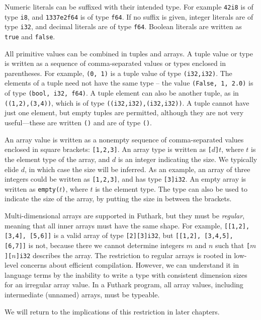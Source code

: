 \documentclass[oneside,11pt]{book}
\begin{document}
Numeric literals can be suffixed with their intended type.  For
example \texttt{42i8} is of type \texttt{i8}, and \texttt{1337e2f64}
is of type \texttt{f64}.  If no suffix is given, integer literals are
of type \texttt{i32}, and decimal literals are of type \texttt{f64}.
Boolean literals are written as \texttt{true} and \texttt{false}.

All primitive values can be combined in tuples and arrays.  A tuple
value or type is written as a sequence of comma-separated values or
types enclosed in parentheses.  For example, \texttt{(0, 1)} is a
tuple value of type \texttt{(i32,i32)}.  The elements of a tuple need
not have the same type -- the value \texttt{(False, 1, 2.0)} is of
type \texttt{(bool, i32, f64)}.  A tuple element can also be another
tuple, as in \texttt{((1,2),(3,4))}, which is of type
\texttt{((i32,i32),(i32,i32))}.  A tuple cannot have just one element,
but empty tuples are permitted, although they are not very useful---these are
written \texttt{()} and are of type \texttt{()}.

An array value is written as a nonempty sequence of comma-separated
values enclosed in square brackets: \texttt{[1,2,3]}.  An array type
is written as \texttt{[$d$]$t$}, where \texttt{$t$} is the element
type of the array, and $d$ is an integer indicating the size.  We
typically elide $d$, in which case the size will be inferred.  As an
example, an array of three integers could be written as
\texttt{[1,2,3]}, and has type \texttt{[3]i32}.  An empty array is
written as \texttt{empty($t$)}, where \texttt{$t$} is the element
type.  The type can also be used to indicate the size of the array, by
putting the size in between the brackets.

Multi-dimensional arrays are supported in Futhark, but they must be
\textit{regular}, meaning that all inner arrays must have the same
shape.  For example, \texttt{[[1,2], [3,4], [5,6]]} is a valid array
of type \texttt{[2][3]i32}, but \texttt{[[1,2], [3,4,5], [6,7]]} is
not, because there we cannot determine integers $m$ and $n$ such that
\texttt{[$m$][$n$]i32} describes the array.  The restriction to
regular arrays is rooted in low-level concerns about efficient
compilation.  However, we can understand it in language terms by the
inability to write a type with consistent dimension sizes for an
irregular array value.  In a Futhark program, all array values,
including intermediate (unnamed) arrays, must be typeable.

We will return to the implications of this restriction in later
chapters.
\end{document}
